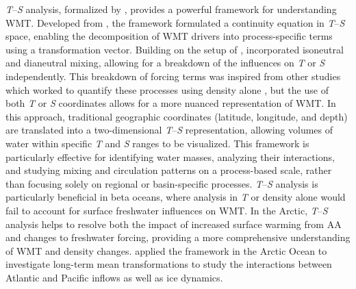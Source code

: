 \documentclass[draft]{agujournal2019}
\begin{document}

\emph{T}--\emph{S} analysis, formalized by , provides a powerful framework for understanding WMT. Developed from , the  framework formulated a continuity equation in \emph{T}--\emph{S} space, enabling the decomposition of WMT drivers into process-specific terms using a transformation vector. Building on the setup of ,  incorporated isoneutral and dianeutral mixing, allowing for a breakdown of the influences on \emph{T} or \emph{S} independently. This breakdown of forcing terms was inspired from other studies which worked to quantify these processes using density alone \cite{Tziperman1986,Nurser1999,Marshall1999,Iudicone2008}, but the use of both \emph{T} or \emph{S} coordinates allows for a more nuanced representation of WMT. In this approach, traditional geographic coordinates (latitude, longitude, and depth) are translated into a two-dimensional \emph{T}--\emph{S} representation, allowing volumes of water within specific \emph{T} and \emph{S} ranges to be visualized. This framework is particularly effective for identifying water masses, analyzing their interactions, and studying mixing and circulation patterns on a process-based scale, rather than focusing solely on regional or basin-specific processes. \emph{T}--\emph{S} analysis is particularly beneficial in beta oceans, where analysis in \emph{T} or density alone would fail to account for surface freshwater influences on WMT. In the Arctic, \emph{T}--\emph{S} analysis helps to resolve both the impact of increased surface warming from AA and changes to freshwater forcing, providing a more comprehensive understanding of WMT and density changes.  applied the  framework in the Arctic Ocean to investigate long-term mean transformations to study the interactions between Atlantic and Pacific inflows as well as ice dynamics.



\end{document}
